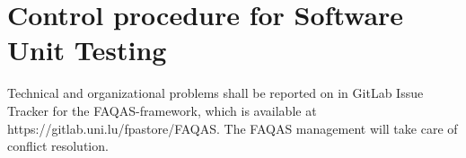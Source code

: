 
\chapter{Control procedure for Software Unit Testing}
\label{chapter:control:procedure}

Technical and organizational problems shall be reported on in GitLab Issue Tracker for the FAQAS-framework, which is available at https://gitlab.uni.lu/fpastore/FAQAS.
The FAQAS management will take care of conflict resolution.
